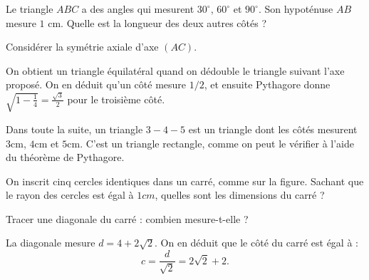 \begin{exo}
Le triangle $ABC$ a des angles qui mesurent $30^\circ$, $60^\circ$ et $90^\circ$.
Son hypoténuse $AB$ mesure $1$ cm.
Quelle est la longueur des deux autres côtés ?
\begin{center}
\end{center}
\begin{hint}
Considérer la symétrie axiale d'axe $(AC)$.
\end{hint}
\begin{sol}
On obtient un triangle équilatéral quand on dédouble le triangle suivant l'axe proposé. On en déduit qu'un côté mesure $1/2$, et ensuite Pythagore donne $\sqrt{1-\frac14} = \frac{\sqrt 3}{2}$ pour le troisième côté.
\end{sol}
\end{exo}



Dans toute la suite, un triangle \og $3-4-5$\fg{} est un triangle dont les côtés mesurent $3$cm, $4$cm et $5$cm. C'est un triangle rectangle, comme on peut le vérifier à l'aide du théorème de Pythagore.




\begin{exo}
On inscrit cinq cercles identiques dans un carré, comme sur la figure.
Sachant que le rayon des cercles est égal à $1cm$, quelles sont les dimensions du carré ?
\begin{center}
\end{center}
\begin{hint}
Tracer une diagonale du carré : combien mesure-t-elle ?
\end{hint}
\begin{sol}
La diagonale mesure $d=4+2\sqrt 2$.
On en déduit que le côté du carré est égal à  :
\[ c = \frac{d}{\sqrt 2} = 2\sqrt 2+2.\]
\end{sol}
\end{exo}


